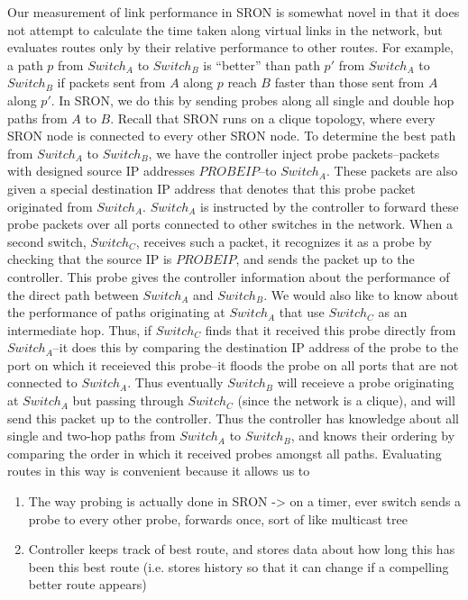 \documentclass[pageno]{jpaper}
\begin{document}
Our measurement of link performance in SRON is somewhat novel in that it does not attempt to calculate 
the time taken along virtual links in the network, but evaluates routes only by their relative performance 
to other routes. For example, a path $p$ from $Switch_A$ to $Switch_B$ is ``better'' than path $p'$ from 
$Switch_A$ to $Switch_B$ if packets sent from $A$ along $p$ reach $B$ faster than those sent from $A$ along
$p'$.  In SRON, we do this by sending probes along all single and double hop paths from $A$ to $B$.
Recall that SRON runs on a clique topology, where every SRON node is connected to every other SRON node.
To determine the best path from $Switch_A$ to $Switch_B$, we have the controller inject probe packets--packets with
designed source IP addresses $PROBEIP$--to $Switch_A$.  These packets are also given a special destination
IP address that denotes that this probe packet originated from $Switch_A$. $Switch_A$ is instructed by 
the controller to forward these probe packets over all ports connected to other switches in the network. 
When a second switch, $Switch_C$, receives such a packet, it recognizes it as a probe by checking that 
the source IP is $PROBEIP$, and sends the packet up to the controller. This probe gives the controller 
information about the performance of the direct path between $Switch_A$ and $Switch_B$. We would also 
like to know about the performance of paths originating at $Switch_A$ that use $Switch_C$ as an intermediate
hop. Thus, if $Switch_C$ finds that it received this probe directly from $Switch_A$--it does this by 
comparing the destination IP address of the probe to the port on which it receieved this probe--it 
floods the probe on all ports that are not connected to $Switch_A$. Thus eventually $Switch_B$ will
receieve a probe originating at $Switch_A$ but passing through $Switch_C$ (since the network is a 
clique), and will send this packet up to the controller. Thus the controller has knowledge about all
single and two-hop paths from $Switch_A$ to $Switch_B$, and knows their ordering by comparing the 
order in which it received probes amongst all paths. Evaluating routes in this way is convenient 
because it allows us to 
\begin{enumerate}
\item
The way probing is actually done in SRON -> on a timer, ever switch sends a probe to every other probe,
forwards once, sort of like multicast tree
\item
Controller keeps track of best route, and stores data about how long this has been this best route (i.e.
stores history so that it can change if a compelling better route appears) 
\end{enumerate}
\end{document}
